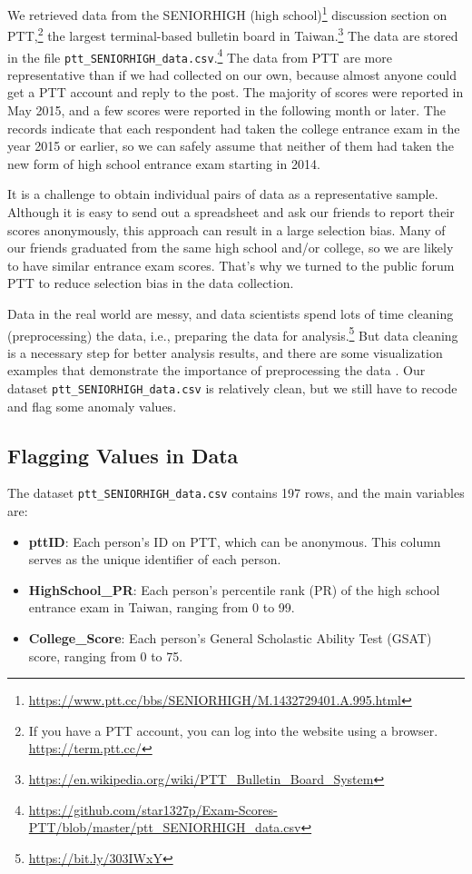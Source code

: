 \documentclass[
]{article}
\providecommand{\tightlist}{%
  \setlength{\itemsep}{0pt}\setlength{\parskip}{0pt}}
\begin{document}
We retrieved data from the SENIORHIGH (high school)\footnote{\url{https://www.ptt.cc/bbs/SENIORHIGH/M.1432729401.A.995.html}}
discussion section on PTT,\footnote{If you have a PTT account, you can
  log into the website using a browser. \url{https://term.ptt.cc/}} the
largest terminal-based bulletin board in Taiwan.\footnote{\url{https://en.wikipedia.org/wiki/PTT_Bulletin_Board_System}}
The data are stored in the file
\texttt{ptt\_SENIORHIGH\_data.csv}.\footnote{\url{https://github.com/star1327p/Exam-Scores-PTT/blob/master/ptt_SENIORHIGH_data.csv}}
The data from PTT are more representative than if we had collected on
our own, because almost anyone could get a PTT account and reply to the
post. The majority of scores were reported in May 2015, and a few scores
were reported in the following month or later. The records indicate that
each respondent had taken the college entrance exam in the year 2015 or
earlier, so we can safely assume that neither of them had taken the new
form of high school entrance exam starting in 2014.

It is a challenge to obtain individual pairs of data as a representative
sample. Although it is easy to send out a spreadsheet and ask our
friends to report their scores anonymously, this approach can result in
a large selection bias. Many of our friends graduated from the same high
school and/or college, so we are likely to have similar entrance exam
scores. That's why we turned to the public forum PTT to reduce selection
bias in the data collection.

Data in the real world are messy, and data scientists spend lots of time
cleaning (preprocessing) the data, i.e., preparing the data for
analysis.\footnote{\url{https://bit.ly/303IWxY}} But data cleaning is a
necessary step for better analysis results, and there are some
visualization examples that demonstrate the importance of preprocessing
the data \citep{chai2020importance}. Our dataset
\texttt{ptt\_SENIORHIGH\_data.csv} is relatively clean, but we still
have to recode and flag some anomaly values.

\hypertarget{flagging-values-in-data}{%
\subsection{Flagging Values in Data}\label{flagging-values-in-data}}

The dataset \texttt{ptt\_SENIORHIGH\_data.csv} contains 197 rows, and
the main variables are:

\begin{itemize}
\tightlist
\item
  \textbf{pttID}: Each person's ID on PTT, which can be anonymous. This
  column serves as the unique identifier of each person.
\item
  \textbf{HighSchool\_PR}: Each person's percentile rank (PR) of the
  high school entrance exam in Taiwan, ranging from 0 to 99.
\item
  \textbf{College\_Score}: Each person's General Scholastic Ability Test
  (GSAT) score, ranging from 0 to 75.
\end{itemize}
\end{document}
